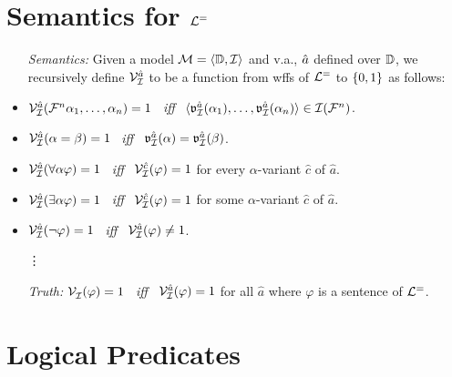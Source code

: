 \documentclass[a4paper, 11pt]{article} %
\begin{document}
\section*{Semantics for $\mathcal{L}^=$}

\begin{itemize}
  \item[\it Semantics:] Given a model $\mathcal{M} = \langle\mathbb{D}, \mathcal{I}\rangle$ and v.a., $\hat{a}$ defined over $\mathbb{D}$, we recursively define $\mathcal{V}_{\mathcal{I}}^{\hat{a}}$ to be a function from wffs of $\mathcal{L}^=$ to $\lbrace0,1\rbrace$ as follows: 
  \item $\mathcal{V}_{\mathcal{I}}^{\hat{a}}(\mathcal{F}^n\alpha_1,\ldots,\alpha_n)=1$ ~\textit{iff}~ $\langle\mathfrak{v}_{\mathcal{I}}^{\hat{a}}{(\alpha_1)},\ldots,\mathfrak{v}_{\mathcal{I}}^{\hat{a}}{(\alpha_n)}\rangle\in\mathcal{I}(\mathcal{F}^n)$.
  \item $\mathcal{V}_{\mathcal{I}}^{\hat{a}}(\alpha=\beta)=1$ ~\textit{iff}~ $\mathfrak{v}_{\mathcal{I}}^{\hat{a}}(\alpha)=\mathfrak{v}_{\mathcal{I}}^{\hat{a}}(\beta)$.
  \item $\mathcal{V}_{\mathcal{I}}^{\hat{a}}(\forall\alpha\varphi)=1$ ~\textit{iff}~ $\mathcal{V}_{\mathcal{I}}^{\hat{c}}(\varphi)=1$ for every $\alpha$-variant $\hat{c}$ of $\hat{a}$.
  \item $\mathcal{V}_{\mathcal{I}}^{\hat{a}}(\exists\alpha\varphi)=1$ ~\textit{iff}~ $\mathcal{V}_{\mathcal{I}}^{\hat{c}}(\varphi)=1$ for some $\alpha$-variant $\hat{c}$ of $\hat{a}$.
  \item $\mathcal{V}_{\mathcal{I}}^{\hat{a}}(\neg\varphi)=1$ ~\textit{iff}~ $\mathcal{V}_{\mathcal{I}}^{\hat{a}}(\varphi)\neq 1$.
  \item[\vdots] 
    \vspace{.1in}
  \item[\it Truth:] $\mathcal{V}_{\mathcal{I}}^{}(\varphi)=1$ ~\textit{iff}~ $\mathcal{V}_{\mathcal{I}}^{\hat{a}}(\varphi)=1$ for all $\hat{a}$ where $\varphi$ is a sentence of $\mathcal{L}^=$. 
\end{itemize}





\section*{Logical Predicates}
\end{document}
